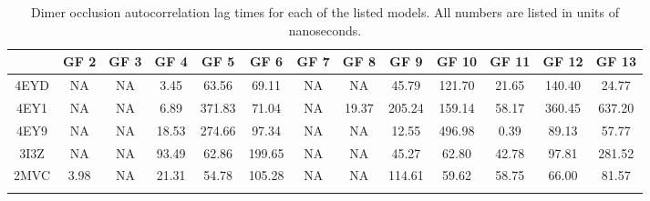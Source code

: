 \documentclass[sn-vancouver]{sn-jnl}
\begin{document}
\renewcommand{\thetable}{S\arabic{table}}
\begin{table}[ht]
\caption{Dimer occlusion autocorrelation lag times for each of the listed models. All numbers are listed in units of nanoseconds.}
\centering
\begin{adjustbox}{width=1\textwidth,center=\textwidth}
\begin{tabular}{@{}ccccccccccccc@{}}
\toprule
&GF 2&GF 3&GF 4&GF 5&GF 6&GF 7&GF 8&GF 9&GF 10&GF 11&GF 12&GF 13\\ \midrule
4EYD&NA& NA&3.45&63.56&69.11& NA&NA&45.79&121.70&21.65&140.40&24.77 \\ %
4EY1&NA& NA&6.89&371.83&71.04& NA&19.37&205.24&159.14&58.17&360.45&637.20 \\ %
4EY9&NA & NA &18.53&274.66&97.34& NA &NA &12.55&496.98&0.39&89.13&57.77 \\ %
3I3Z&NA & NA &93.49&62.86&199.65& NA & NA &45.27&62.80&42.78&97.81&281.52 \\ %
2MVC&3.98&NA &21.31&54.78&105.28&NA &NA &114.61&59.62&58.75&66.00&81.57 \\ \botrule
\end{tabular}
\end{adjustbox}
\label{supple_tab: occlusion_lag}
\end{table}
\end{document}

